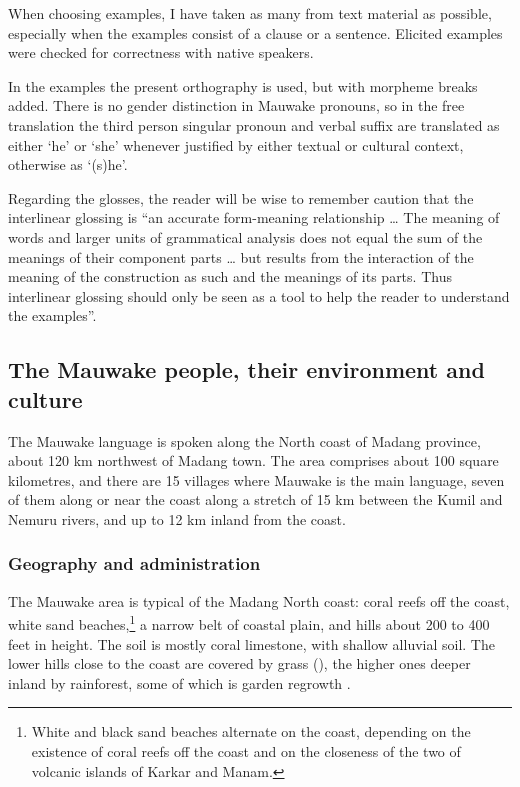 When choosing examples, I have taken as many from text material as possible, especially when the examples consist of a clause or a sentence.  Elicited examples were checked for correctness with native speakers.

In the examples the present orthography is used, but with morpheme breaks added. There is no gender distinction in Mauwake pronouns, so in the free translation the third person singular pronoun and verbal suffix are translated as either `he' or `she' whenever justified by either textual or cultural context, otherwise as `(s)he'. 

Regarding the glosses, the reader will be wise to remember  caution that the interlinear glossing is  ``an accurate form-meaning relationship {\dots} The meaning of words and larger units of grammatical analysis does not equal the sum of the meanings of their component parts {\dots} but results from the interaction of the meaning of the construction as such and the meanings of its parts.  Thus interlinear glossing should only be seen as a tool to help the reader to understand the examples''. 

\subsection{The Mauwake people, their environment and culture}
The Mauwake language is spoken along the North coast of Madang province, about 120 km northwest of Madang town. The area comprises about 100 square kilometres, and there are 15 villages where Mauwake is the main language, seven of them along or near the coast along a stretch of 15 km between the Kumil and Nemuru rivers, and up to 12 km inland from the coast.

\subsubsection{Geography and administration} 
The Mauwake area is typical of the Madang North coast: coral reefs off the coast, white sand beaches,\footnote{White and black sand beaches alternate on the coast, depending on the existence of coral reefs off the coast and on the closeness of the two of volcanic islands of Karkar and Manam.} a narrow belt of coastal plain, and hills about 200 to 400 feet in height. The soil is mostly coral limestone, with shallow alluvial soil.  The lower hills close to the coast are covered by  grass (), the higher ones deeper inland by rainforest, some of which is garden regrowth \citep[22]{HaantjensEtAl1976}. 

